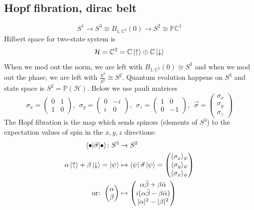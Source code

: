 \documentclass[12pt,a4paper]{article}
\newcommand{\ua}{\ket{\uparrow}}
\newcommand{\da}{\ket{\downarrow}}
\renewcommand\:{\colon}
\begin{document}
\subsection{Hopf fibration, dirac belt}
\begin{equation*}
	S^{1} \to S^{3} \cong B_{1,\mathbb{C}^2}(0) \to S^{2} \cong \mathbb{PC}^{1}
\end{equation*}
Hilbert space for two-state system is
\begin{equation*}
	\mathcal{H}=\mathbb{C}^2 = \mathbb{C}\ua \oplus \mathbb{C}\da
\end{equation*}
When we mod out the norm, we are left with $B_{1,\mathbb{C}^2}(0) \cong S^{3}$ and when we mod out the phase, we are left with $\frac{S^{3}}{S^{1}}\cong S^{2}.$ Quantum evolution happens on $S^{3}$ and state space is $S^{2}=\mathbb{P}(\mathcal{H}).$ 
Below we use pauli matrices
\begin{equation*}
  \sigma_x =
  \begin{pmatrix}
	  0 & 1 \\ 1 & 0
  \end{pmatrix}, \ \ 
  \sigma_y = 
  \begin{pmatrix}
	  0 & -i \\ i & 0
  \end{pmatrix}, \ \
  \sigma_z = 
  \begin{pmatrix}
	  1 & 0 \\ 0 & -1
  \end{pmatrix}, \ \ 
  \vec{\sigma} = 
  \begin{pmatrix}
    \sigma_x \\ \sigma_y \\ \sigma_z
  \end{pmatrix}
\end{equation*}
The Hopf fibration is the map which sends spinors (elements of $S^3$) to the expectation values of spin in the $x,y,z$ directions:
\begin{align*}
	\langle \bullet | \vec{\sigma} | \bullet \rangle\: S^3 &\to S^2 \\
	\alpha\ua+\beta\da = \ket{\psi} &\mapsto \bra{\psi}\vec{\sigma}\ket{\psi} = 
	\begin{pmatrix}
\langle \sigma_x \rangle _{\psi} \\
\langle \sigma_y \rangle _{\psi} \\
\langle \sigma_x \rangle _{\psi} \\
\end{pmatrix} \\
\text{or: } 
\begin{pmatrix}
	\alpha \\
	\beta
\end{pmatrix}
&\mapsto 
\begin{pmatrix}
	\alpha \bar{\beta}+\beta \bar{\alpha} \\
	i(\alpha \bar{\beta}-\beta \bar{\alpha}) \\
	|\alpha|^2 - |\beta|^2
\end{pmatrix}
\end{align*}
\end{document}
